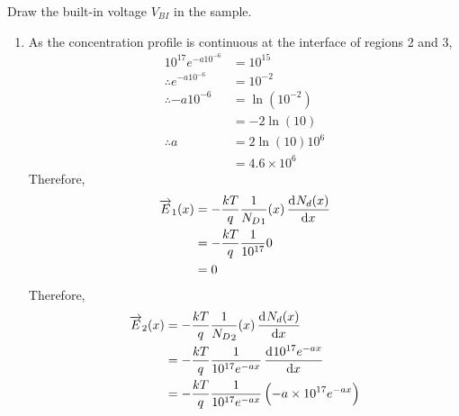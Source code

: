 \documentclass[fleqn, a4paper, 11pt, oneside]{amsart}
\theoremstyle{definition}
\theoremstyle{theorem}
\begin{document}
\begin{question}
\begin{enumerate}
\begin{figure}[H]
			\end{figure}
			Draw the built-in voltage $V_{B I}$ in the sample.
	\end{enumerate}
\end{question}

\begin{solution}
	\begin{enumerate}
		\item
			As the concentration profile is continuous at the interface of regions 2 and 3,
			\begin{align*}
				10^{17} e^{-a 10^{-6}}    & = 10^{15}                   \\
				\therefore e^{-a 10^{-6}} & = 10^{-2}                   \\
				\therefore -a 10^{-6}     & = \ln\left( 10^{-2} \right) \\
                                                          & = -2 \ln(10)                \\
				\therefore a              & = 2 \ln(10) 10^6            \\
                                                          & = 4.6 \times 10^6
			\end{align*}
			Therefore,
			\begin{align*}
				\overrightarrow{E}_1(x) & = -\frac{k T}{q} \frac{1}{{N_D}_1}(x) \dod{N_d(x)}{x} \\
                                                        & = -\frac{k T}{q} \frac{1}{10^{17}} 0                  \\
                                                        & = 0
			\end{align*}
			Therefore,
			\begin{align*}
				\overrightarrow{E}_2(x) & = -\frac{k T}{q} \frac{1}{{N_D}_2}(x) \dod{N_d(x)}{x}                                 \\
                                                        & = -\frac{k T}{q} \frac{1}{10^{17} e^{-a x}} \dod{10^{17} e^{-a x}}{x}                 \\
                                                        & = -\frac{k T}{q} \frac{1}{10^{17} e^{-a x}} \left( -a \times 10^{17} e^{-a x} \right) \\

\end{align*}
\end{enumerate}
\end{solution}
\end{document}
